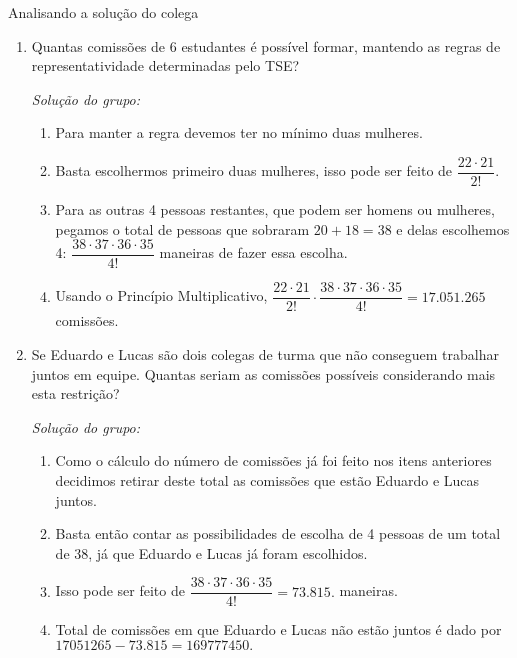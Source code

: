 \begin{task}{Analisando a solução do colega}
\begin{enumerate}
\item Quantas comissões de 6 estudantes é possível formar, mantendo as regras de representatividade determinadas pelo TSE?


\textit{Solução do grupo:}

\begin{enumerate}[label=\titem{\arabic*.}]
\item Para manter a regra devemos ter no mínimo duas mulheres. 
\item Basta escolhermos primeiro duas mulheres, isso pode ser feito de $\dfrac{22 \cdot 21}{2!}$.
\item Para as outras 4 pessoas restantes, que podem ser homens ou mulheres, pegamos o total de pessoas que sobraram $20+18=38$ e delas escolhemos 4:
$\dfrac{38 \cdot 37\cdot 36 \cdot 35}{4!}$ maneiras de fazer essa escolha. 
\item Usando o Princípio Multiplicativo, $\dfrac{22 \cdot 21}{2!} \cdot \dfrac{38 \cdot 37 \cdot36 \cdot 35}{4!}= 17.051.265$ comissões.
\end{enumerate}

\item Se Eduardo e Lucas são dois colegas de turma que não conseguem trabalhar juntos em equipe. Quantas seriam as comissões possíveis considerando mais esta restrição? 


\textit{Solução do grupo:}

\begin{enumerate}[label=\titem{\arabic*.}]
\item Como o cálculo do número de comissões já foi feito nos itens anteriores decidimos retirar deste total as comissões que estão Eduardo e Lucas juntos. 
\item Basta então contar as possibilidades de escolha de 4 pessoas de um total de 38, já que Eduardo e Lucas já foram escolhidos. 
\item Isso pode ser feito de $\dfrac{38 \cdot 37 \cdot 36 \cdot 35}{4!} = 73.815.$ maneiras. 
\item Total de comissões em que Eduardo e Lucas não estão juntos é dado por $17051265-73.815=169777450.$
\end{enumerate}
\end{enumerate}

\end{task}

